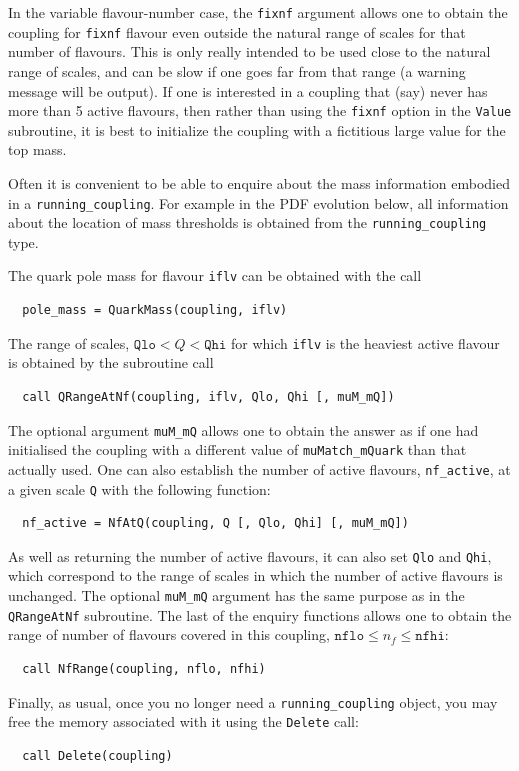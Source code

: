 \documentclass[12pt]{article}
\newcommand{\ttt}[1]{\texttt{#1}}
\begin{document}
In the variable flavour-number case, the \ttt{fixnf} argument allows
one to obtain the coupling for \ttt{fixnf} flavour even outside the
natural range of scales for that number of flavours. This is only
really intended to be used close to the natural range of scales, and
can be slow if one goes far from that range (a warning message will be
output). If one is interested in a coupling that (say) never has more
than 5 active flavours, then rather than using the \ttt{fixnf} option
in the \ttt{Value} subroutine, it is best to initialize the coupling
with a fictitious large value for the top mass.

Often it is convenient to be able to enquire about the mass information
embodied in a \ttt{running\_coupling}. For example in the PDF
evolution below, all information about the location of mass thresholds is
obtained from the \ttt{running\_coupling} type.

The quark pole mass for flavour \ttt{iflv} can be obtained with the
call
\begin{verbatim}
  pole_mass = QuarkMass(coupling, iflv)
\end{verbatim}
The range of scales, $\ttt{Qlo} < Q < \ttt{Qhi}$ for which \ttt{iflv}
is the heaviest active flavour is obtained by the subroutine call
\begin{verbatim}
  call QRangeAtNf(coupling, iflv, Qlo, Qhi [, muM_mQ])
\end{verbatim}
The optional argument \ttt{muM\_mQ} allows one to obtain the answer as
if one had initialised the coupling with a different value of
\ttt{muMatch\_mQuark} than that actually used. One can also establish
the number of active flavours, \ttt{nf\_active}, at a given scale
\ttt{Q} with the following function:
\begin{verbatim}
  nf_active = NfAtQ(coupling, Q [, Qlo, Qhi] [, muM_mQ])
\end{verbatim}
As well as returning the number of active flavours, it can also set
\ttt{Qlo} and \ttt{Qhi}, which correspond to the range of scales in
which the number of active flavours is unchanged. The optional
\ttt{muM\_mQ} argument has the same purpose as in the \ttt{QRangeAtNf}
subroutine. The last of the enquiry functions allows one to obtain the
range of number of flavours covered in this coupling, $\ttt{nflo} \le
n_f \le \ttt{nfhi}$:
\begin{verbatim}
  call NfRange(coupling, nflo, nfhi)
\end{verbatim}

Finally, as usual, once you no longer need a \ttt{running\_coupling}
object, you may free the memory associated with it using the
\ttt{Delete} call:
\begin{verbatim}
  call Delete(coupling)
\end{verbatim}
\end{document}

